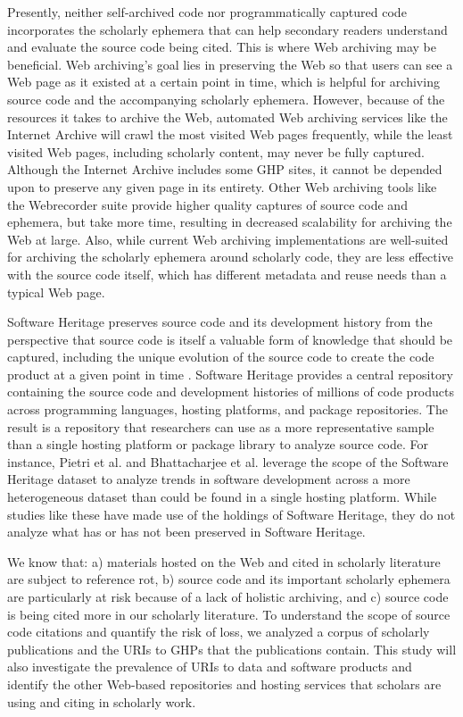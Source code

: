 Presently, neither self-archived code nor programmatically captured code incorporates the scholarly ephemera that can help secondary readers understand and evaluate the source code being cited. This is where Web archiving may be beneficial. Web archiving's goal lies in preserving the Web so that users can see a Web page as it existed at a certain point in time, which is helpful for archiving source code and the accompanying scholarly ephemera. However, because of the resources it takes to archive the Web, automated Web archiving services like the Internet Archive will crawl the most visited Web pages frequently, while the least visited Web pages, including scholarly content, may never be fully captured. Although the Internet Archive includes some GHP sites, it cannot be depended upon to preserve any given page in its entirety. Other Web archiving tools like the Webrecorder suite \cite{webrecorder} provide higher quality captures of source code and ephemera, but take more time, resulting in decreased scalability for archiving the Web at large. Also, while current Web archiving implementations are well-suited for archiving the scholarly ephemera around scholarly code, they are less effective with the source code itself, which has different metadata and reuse needs than a typical Web page. 

Software Heritage preserves source code and its development history from the perspective that source code is itself a valuable form of knowledge that should be captured, including the unique evolution of the source code to create the code product at a given point in time \cite{dicosmo-ipres2017}. Software Heritage provides a central repository containing the source code and development histories of millions of code products across programming languages, hosting platforms, and package repositories. The result is a repository that researchers can use as a more representative sample than a single hosting platform or package library to analyze source code. For instance, Pietri et al. \cite{pietri-msr2020} and Bhattacharjee et al. \cite{bhattacharjee-msr2020} leverage the scope of the Software Heritage dataset to analyze trends in software development across a more heterogeneous dataset than could be found in a single hosting platform. While studies like these have made use of the holdings of Software Heritage, they do not analyze what has or has not been preserved in Software Heritage.

We know that: a) materials hosted on the Web and cited in scholarly literature are subject to reference rot, b) source code and its important scholarly ephemera are particularly at risk because of a lack of holistic archiving,
and c) source code is being cited more in our scholarly literature. To understand the scope of source code citations and quantify the risk of loss, we analyzed a corpus of scholarly publications and the URIs to GHPs that the publications contain. This study will also investigate the prevalence of URIs to data and software products and identify the other Web-based repositories and hosting services that scholars are using and citing in scholarly work. 
